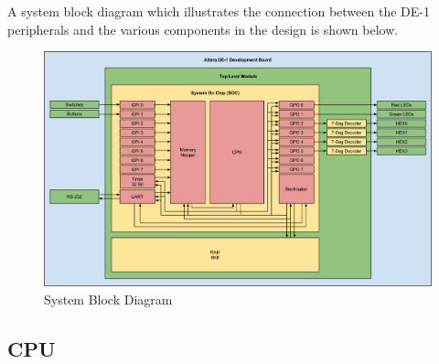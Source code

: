 \documentclass[10pt]{article}
\begin{document}
    A system block diagram which illustrates the connection between the DE-1
    peripherals and the various components in the design is shown below.

    \begin{figure}[H]
        \centering
        \includegraphics[width=\linewidth]{./block_diagram.png}
        \caption{System Block Diagram}
    \end{figure}



    \subsection{CPU}
\end{document}
